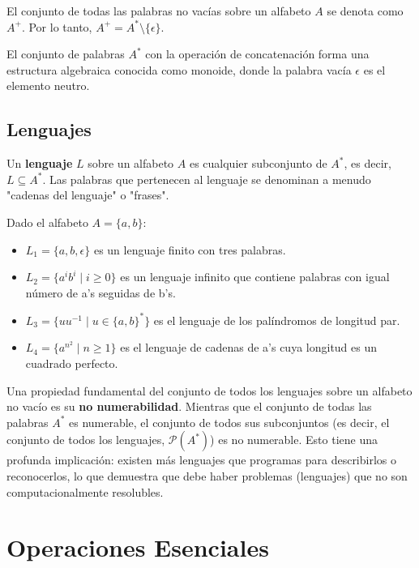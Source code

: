\begin{anotacion}
El conjunto de todas las palabras no vacías sobre un alfabeto $A$ se denota como $A^+$. Por lo tanto, $A^+ = A^* \setminus \{\epsilon\}$.
\end{anotacion}

El conjunto de palabras $A^*$ con la operación de concatenación forma una estructura algebraica conocida como monoide, donde la palabra vacía $\epsilon$ es el elemento neutro.

\subsection{Lenguajes}

\begin{definicion}[Lenguaje]
Un \textbf{lenguaje} $L$ sobre un alfabeto $A$ es cualquier subconjunto de $A^*$, es decir, $L \subseteq A^*$. Las palabras que pertenecen al lenguaje se denominan a menudo "cadenas del lenguaje" o "frases".
\end{definicion}

\begin{ejemplo}
    Dado el alfabeto $A = \{a, b\}$:
    \begin{itemize}
        \item $L_1 = \{a, b, \epsilon\}$ es un lenguaje finito con tres palabras.
        \item $L_2 = \{a^ib^i \mid i \geq 0\}$ es un lenguaje infinito que contiene palabras con igual número de a's seguidas de b's.
        \item $L_3 = \{uu^{-1} \mid u \in \{a, b\}^*\}$ es el lenguaje de los palíndromos de longitud par.
        \item $L_4 = \{a^{n^2} \mid n \geq 1\}$ es el lenguaje de cadenas de a's cuya longitud es un cuadrado perfecto.
    \end{itemize}
\end{ejemplo}

Una propiedad fundamental del conjunto de todos los lenguajes sobre un alfabeto no vacío es su \textbf{no numerabilidad}. Mientras que el conjunto de todas las palabras $A^*$ es numerable, el conjunto de todos sus subconjuntos (es decir, el conjunto de todos los lenguajes, $\mathcal{P}(A^*)$) es no numerable. Esto tiene una profunda implicación: existen más lenguajes que programas para describirlos o reconocerlos, lo que demuestra que debe haber problemas (lenguajes) que no son computacionalmente resolubles.

\section{Operaciones Esenciales}

